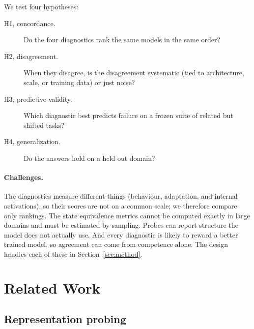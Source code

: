 \documentclass[11pt]{scrartcl}
\begin{document}
We test four hypotheses:
\begin{description}
    \item[H1, concordance.] Do the four diagnostics rank the same models in the same order?
    \item[H2, disagreement.] When they disagree, is the disagreement systematic (tied to architecture,
    scale, or training data) or just noise?
    \item[H3, predictive validity.] Which diagnostic best predicts failure on a frozen suite of related but
    shifted tasks?
    \item[H4, generalization.] Do the answers hold on a held out domain?
\end{description}

\paragraph{Challenges.} The diagnostics measure different things (behaviour, adaptation, and internal
activations), so their scores are not on a common scale; we therefore compare only rankings. The state
equivalence metrics cannot be computed exactly in large domains and must be estimated by sampling. Probes can
report structure the model does not actually use. And every diagnostic is likely to reward a better trained
model, so agreement can come from competence alone. The design handles each of these in
Section~\ref{sec:method}.

\section{Related Work}
\label{sec:related}

%

\subsection{Representation probing}
\end{document}
